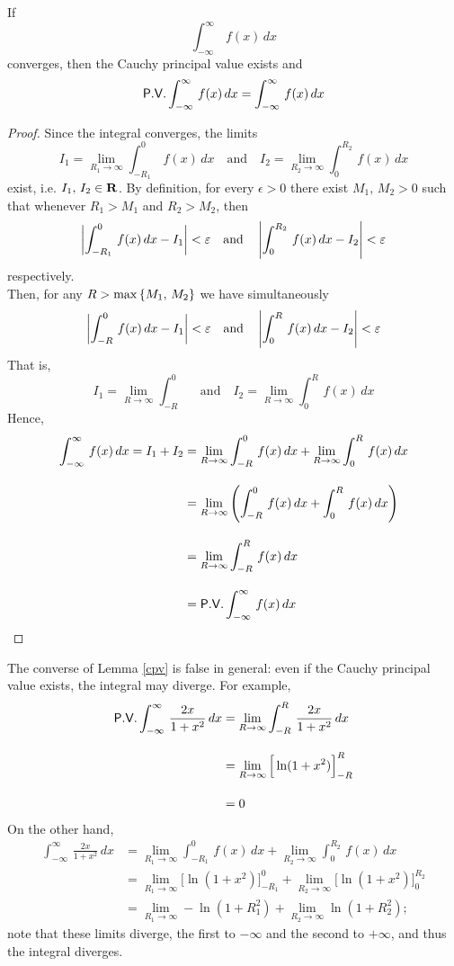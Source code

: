 \vspace*{1em}

\begin{lemma}\label{cpv}
If 
\[\int_{-\infty}^\infty\,f(x)\,dx\]
converges, then the Cauchy principal value exists and
\[\mathsf{P.V.}\int_{-\infty}^\infty\,f(x)\,dx = \int_{-\infty}^\infty\,f(x)\,dx\]
\end{lemma}
\begin{proof}
Since the integral converges, the limits
\[I_1 = \lim_{R_1 \to \infty}\int^0_{-R_1}\,f(x)\,dx \quad \text{and} \quad I_2 = \lim_{R_2 \to \infty}\int_0^{R_2}\,f(x)\,dx\]
exist, i.e. $I_1,\,I_2 \in \mathbf R$. By definition, for every $\epsilon > 0$ there exist $M_1,\,M_2 > 0$ such that whenever $R_1 > M_1$ and $R_2 > M_2$, then
\[\left\lvert\int^0_{-R_1}\,f(x)\,dx - I_1\right\rvert < \varepsilon \quad \text{and} \quad \left\lvert\int_0^{R_2}\,f(x)\,dx - I_2\right\rvert < \varepsilon\]
respectively.\\[0.5em]
Then, for any $R > \max\left\{M_1,\,M_2\right\}$ we have simultaneously
\[\left\lvert\int^0_{-R}\,f(x)\,dx - I_1\right\rvert < \varepsilon \quad \text{and} \quad \left\lvert\int_0^{R}\,f(x)\,dx - I_2\right\rvert < \varepsilon\]
That is,
\[I_1 = \lim_{R \to \infty}\int^0_{-R} \quad \text{and} \quad I_2 = \lim_{R \to \infty}\int_0^{R}\,f(x)\,dx\]
Hence,
\begin{align*}
\int_{-\infty}^\infty\,f(x)\,dx = I_1 + I_2 &=  \lim_{R \to \infty}\int^0_{-R}\,f(x)\,dx + \lim_{R \to \infty}\int_0^{R}\,f(x)\,dx\\[1em]
 &=  \lim_{R \to \infty}\left(\int^0_{-R}\,f(x)\,dx + \int_0^{R}\,f(x)\,dx\right)\\[1em]
 &=  \lim_{R \to \infty}\int^R_{-R}\,f(x)\,dx\\[1em]
 &=  \mathsf{P.V.}\int_{-\infty}^\infty\,f(x)\,dx
\end{align*}
\end{proof}

\vspace*{1em}

\begin{remark}
The converse of Lemma \ref{cpv} is false in general: even if the Cauchy principal value exists, the integral may diverge. For example,
\begin{align*}
\mathsf{P.V.}\int_{-\infty}^\infty\,\frac{2x}{1 + x^2}\,dx &= \lim_{R \to \infty}\int^R_{-R}\,\frac{2x}{1 + x^2}\,dx\\[1em]
 &= \lim_{R \to \infty}\Big[\ln(1 + x^2)\Big]_{-R}^R\\[1em]
 &= 0
\end{align*}
On the other hand,
\begin{align*}
\int_{-\infty}^\infty\,\frac{2x}{1 + x^2}\,dx &= \lim_{R_1 \to \infty}\int^0_{-R_1}\,f(x)\,dx + \lim_{R_2 \to \infty}\int_0^{R_2}\,f(x)\,dx\\[1em]
 &= \lim_{R_1 \to \infty}\Big[\ln(1 + x^2)\Big]^0_{-R_1} + \lim_{R_2 \to \infty}\Big[\ln(1 + x^2)\Big]_0^{R_2}\\[1em]
 &= \lim_{R_1 \to \infty}-\ln(1 + R_1^2) + \lim_{R_2 \to \infty}\ln(1 + R_2^2);
\end{align*}
note that these limits diverge, the first to $-\infty$ and the second to $+\infty$, and thus the integral diverges.
\end{remark}

